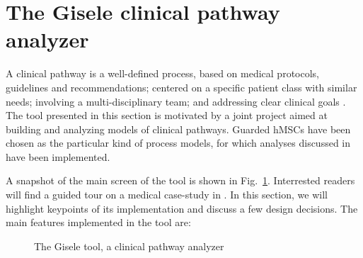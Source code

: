 \section{The Gisele clinical pathway analyzer\label{section:tool-clinical-pathway-analyzer}}

A clinical pathway is a well-defined process, based on medical protocols, guidelines and recommendations; centered on a specific patient class with similar needs; involving a multi-disciplinary team; and addressing clear clinical goals \cite{Middleton:2000}. The tool presented in this section is motivated by a joint project aimed at building and analyzing models of clinical pathways. Guarded hMSCs have been chosen as the particular kind of process models, for which analyses discussed in \cite{Damas:2011} have been implemented.

A snapshot of the main screen of the tool is shown in Fig.~\ref{image:gisele-tool}. Interrested readers will find a guided tour on a medical case-study in \cite{Damas:2011}. In this section, we will highlight keypoints of its implementation and discuss a few design decisions. The main features implemented in the tool are:

\begin{figure}[H]
\centering{}
  \caption{The Gisele tool, a clinical pathway analyzer\label{image:gisele-tool}}
\end{figure}

